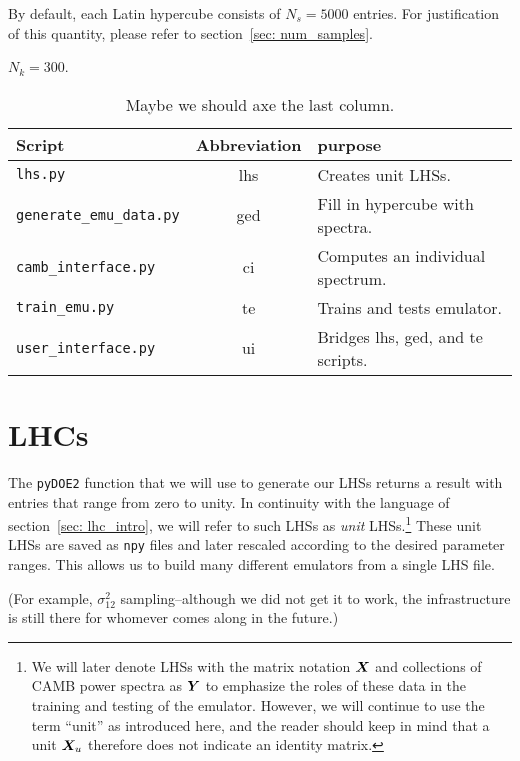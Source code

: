 \begin{comment}
\UseVerb{utils}
\end{comment}

By default, each Latin hypercube consists of $N_s = 5000$ entries. For 
justification of this quantity, please refer to
section~\ref{sec: num_samples}.

$N_k = 300$.

\begin{table}[ht!]
\centering
\begin{tabular}{l|c|l}
\hline
Script & Abbreviation & purpose \\ \hline
\Verb|lhs.py| & lhs & Creates unit LHSs. \\
\Verb|generate_emu_data.py| & ged & Fill in hypercube with spectra. \\
\Verb|camb_interface.py| & ci & Computes an individual spectrum. \\
\Verb|train_emu.py| & te & Trains and tests emulator. \\
\Verb|user_interface.py| & ui & Bridges lhs, ged, and te scripts. \\
\end{tabular}
 \cprotect\caption[Summary of CL Scripts]{Maybe we should axe the last
 	column.}
 \label{tab: script_summary}
\end{table}


\section{LHCs}
\label{sec: lhc_outline}

The \verb|pyDOE2| function that we will use to generate our LHSs
returns a result with entries that range from zero to unity. In continuity
with the language of section~\ref{sec: lhc_intro}, we will refer
to such LHSs as \textit{unit} LHSs.\footnote{We will later denote LHSs with 
the matrix notation $\bm{X}$ and collections of CAMB power spectra as
$\bm{Y}$ to
emphasize the roles of these data in the training and testing of the emulator. 
However, we will continue to use the term ``unit'' as introduced here, and 
the reader should keep in mind that a unit $\bm{X}_u$ therefore does not
indicate an identity matrix.} These unit LHSs are saved as \verb|npy| files
and later rescaled according to the desired parameter ranges. This allows us
to build many different emulators from a single LHS file.

(For example, $\sigma_{12}^2$ sampling--although we did not
get it to work, the infrastructure is still there for whomever comes along in
the future.)

